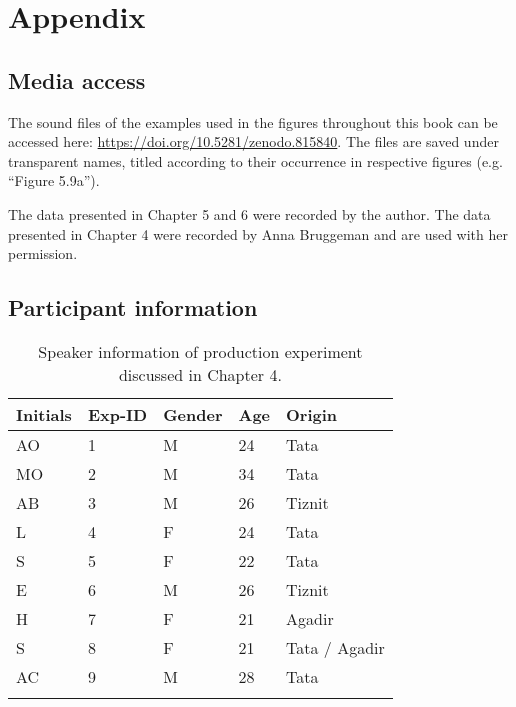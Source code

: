 \chapter{Appendix}
\section{Media access}
The sound files of the examples used in the figures throughout this book can be accessed here: \url{https://doi.org/10.5281/zenodo.815840}. The files are saved under transparent names, titled according to their occurrence in respective figures (e.g. “Figure 5.9a”).

The data presented in Chapter 5 and 6 were recorded by the author. The data presented in Chapter 4 were recorded by Anna Bruggeman and are used with her permission.

\section{Participant information}
\begin{table}
\caption{Speaker information of production experiment discussed in Chapter 4.}
\label{Table A1}
\begin{tabular}{lllll}
\lsptoprule
\textbf{Initials}                        & \textbf{Exp-ID} & \textbf{Gender} & \textbf{Age} & \textbf{Origin}        \\
\midrule
AO                              & 1      & M      & 24  & Tata          \\
MO                              & 2      & M      & 34  & Tata          \\
AB                              & 3      & M      & 26  & Tiznit        \\
L                               & 4      & F      & 24  & Tata          \\
S                               & 5      & F      & 22  & Tata          \\
E                               & 6      & M      & 26  & Tiznit        \\
H                               & 7      & F      & 21  & Agadir        \\
S                               & 8      & F      & 21  & Tata / Agadir \\
AC                              & 9      & M      & 28  & Tata         \\
\lspbottomrule
\end{tabular}
\end{table}

